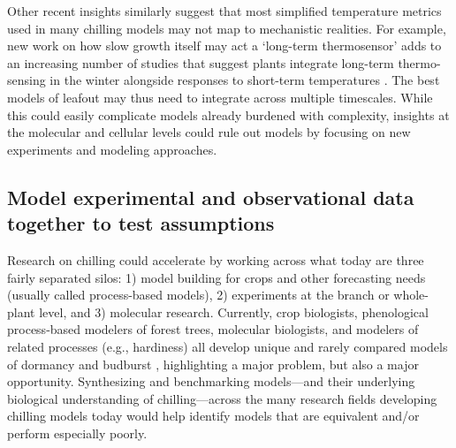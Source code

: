 \documentclass[11pt]{article}
\newcommand{\R}[1]{\label{#1}\linelabel{#1}}
\begin{document}
Other recent insights similarly suggest that most simplified temperature metrics used in many chilling models may not map to mechanistic realities.\R{r2terms} For example, new work on how slow growth itself may act  a `long-term thermosensor' \citep{zhao2020temperature} 
adds to an increasing number of studies that suggest plants integrate long-term thermo-sensing in the winter alongside responses to short-term temperatures \citep{antoniou2021feeling,Satake2022}. The best models of leafout may thus need to integrate across multiple timescales. While this could easily complicate models already burdened with complexity, insights at the molecular and cellular levels\R{r2terms3} could rule out models by focusing on new experiments and modeling approaches. 


\subsection*{Model experimental and observational data together to test assumptions} 
Research on chilling could accelerate by working across what today are three fairly separated silos: 1) model building for crops and other forecasting needs (usually called process-based models), 2) experiments at the branch or whole-plant level, and 3) molecular research. Currently, crop biologists, phenological process-based modelers of forest trees, molecular biologists, and modelers of related processes (e.g., hardiness) 
all develop unique and rarely compared models of dormancy and budburst \citep[but see][]{kovaleskipreprint}, highlighting a major problem, but also a major opportunity. Synthesizing and benchmarking models---and their underlying biological understanding of chilling---across the many research fields developing chilling models today would help identify models that are equivalent and/or perform especially poorly. %
\end{document}

